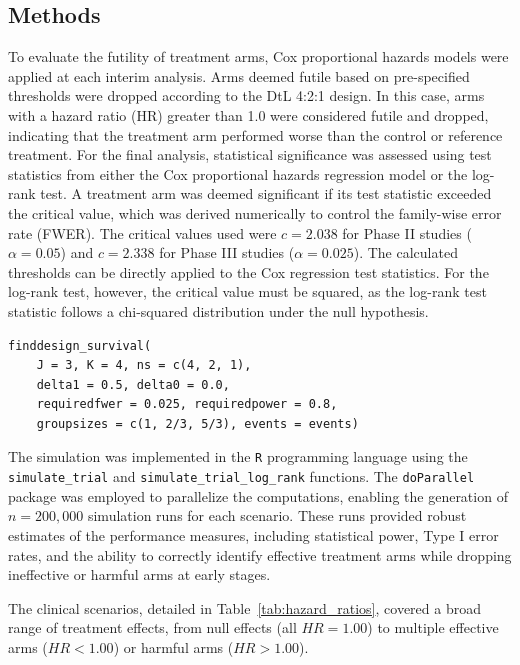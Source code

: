 \documentclass[11pt, a4paper]{article}\usepackage[]{graphicx}\usepackage[]{xcolor}
\begin{document}
\subsection*{Methods}
To evaluate the futility of treatment arms, Cox proportional hazards models were applied at each interim analysis. Arms deemed futile based on pre-specified thresholds were dropped according to the DtL 4:2:1 design. In this case, arms with a hazard ratio (HR) greater than 1.0 were considered futile and dropped, indicating that the treatment arm performed worse than the control or reference treatment. For the final analysis, statistical significance was assessed using test statistics from either the Cox proportional hazards regression model or the log-rank test. A treatment arm was deemed significant if its test statistic exceeded the critical value, which was derived numerically to control the family-wise error rate (FWER). The critical values used were \(c = 2.038\) for Phase II studies (\(\alpha = 0.05\)) and \(c = 2.338\) for Phase III studies (\(\alpha = 0.025\)). The calculated thresholds can be directly applied to the Cox regression test statistics. For the log-rank test, however, the critical value must be squared, as the log-rank test statistic follows a chi-squared distribution under the null hypothesis.

\begin{verbatim}
finddesign_survival(
    J = 3, K = 4, ns = c(4, 2, 1),
    delta1 = 0.5, delta0 = 0.0,
    requiredfwer = 0.025, requiredpower = 0.8,
    groupsizes = c(1, 2/3, 5/3), events = events)
\end{verbatim}

The simulation was implemented in the \texttt{R} programming language using the \texttt{simulate\_trial} and \texttt{simulate\_trial\_log\_rank} functions. The \texttt{doParallel}~\citep{doParallel} package was employed to parallelize the computations, enabling the generation of \(n = 200,000\) simulation runs for each scenario. These runs provided robust estimates of the performance measures, including statistical power, Type I error rates, and the ability to correctly identify effective treatment arms while dropping ineffective or harmful arms at early stages.

The clinical scenarios, detailed in Table~\ref{tab:hazard_ratios}, covered a broad range of treatment effects, from null effects (all \(HR = 1.00\)) to multiple effective arms (\(HR < 1.00\)) or harmful arms (\(HR > 1.00\)).
\end{document}
